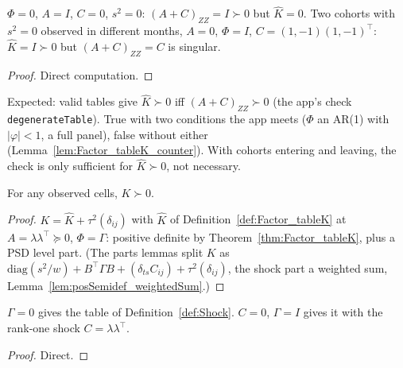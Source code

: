 \begin{lemma}\label{lem:Factor_tableK_counter}
  \leanok
  $\Phi = 0$, $A = I$, $C = 0$, $s^2 = 0$: $(A + C)_{ZZ} = I \succ 0$ but $\hat K = 0$. Two cohorts
  with $s^2 = 0$ observed in different months, $A = 0$, $\Phi = I$,
  $C = (1, -1)(1, -1)^\top$: $\hat K = I \succ 0$ but $(A + C)_{ZZ} = C$ is singular.
\end{lemma}
\begin{proof}
  \leanok
  Direct computation.
\end{proof}

\begin{remark}[Finding 34]
  Expected: valid tables give $\hat K \succ 0$ iff $(A + C)_{ZZ} \succ 0$ (the app's check
  \texttt{degenerateTable}). True with two conditions the app meets ($\Phi$ an AR(1) with
  $|\varphi| < 1$, a full panel), false without either
  (Lemma~\ref{lem:Factor_tableK_counter}). With cohorts entering and leaving, the check is
  only sufficient for $\hat K \succ 0$, not necessary.
\end{remark}

\begin{theorem}[$K \succ 0$]\label{thm:Factor_K}
  \leanok
  For any observed cells, $K \succ 0$.
\end{theorem}
\begin{proof}
  \leanok
  $K = \hat K + \tau^2(\delta_{ij})$ with $\hat K$ of Definition~\ref{def:Factor_tableK} at
  $A = \lambda\lambda^\top \succeq 0$, $\Phi = \Gamma$: positive definite by
  Theorem~\ref{thm:Factor_tableK}, plus a PSD level part. (The parts lemmas split $K$ as
  $\mathrm{diag}(s^2/w) + B^\top\Gamma B + (\delta_{ts}C_{ij}) + \tau^2(\delta_{ij})$, the shock
  part a weighted sum, Lemma~\ref{lem:posSemidef_weightedSum}.)
\end{proof}

\begin{lemma}\label{lem:Factor_shock}
  \leanok
  $\Gamma = 0$ gives the table of Definition~\ref{def:Shock}. $C = 0$, $\Gamma = I$ gives it
  with the rank-one shock $C = \lambda\lambda^\top$.
\end{lemma}
\begin{proof}
  \leanok
  Direct.
\end{proof}

